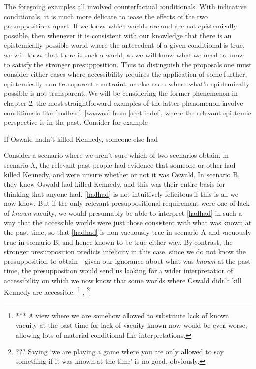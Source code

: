 \documentclass[If.tex]{subfiles}
\begin{document}
\begin{prop}
The foregoing examples all involved counterfactual conditionals. With indicative conditionals, it is much more delicate to tease the effects of the two presuppositions apart. If we know which worlds are and are not epistemically possible, then whenever it is consistent with our knowledge that there is an epistemically possible world where the antecedent of a given conditional is true, we will know that there is such a world, so we will know what we need to know to satisfy the stronger presupposition. Thus to distinguish the proposals one must consider either cases where accessibility requires the application of some further, epistemically non-transparent constraint, or else cases where what's epistemically possible is not transparent. We will be considering the former phenemenon in chapter 2; the most straightforward examples of the latter phenomenon involve conditionals like \ref{hadhad}--\ref{waswas} from \autoref{sect:indcf}, where the relevant epistemic perspective is in the past. Consider for example
\begin{prop}
	\sitem[\ref{hadhad}] If Oswald hadn't killed Kennedy, someone else had 
\end{prop}
Consider a scenario where we aren't sure which of two scenarios obtain. In scenario A, the relevant past people had evidence that someone or other had killed Kennedy, and were unsure whether or not it was Oswald. In scenario B, they knew Oswald had killed Kennedy, and this was their entire basis for thinking that anyone had. \ref{hadhad} is not intuitively felicitous if this is all we now know. But if the only relevant presuppositional requirement were one of lack of \emph{known} vacuity, we would presumably be able to interpret \ref{hadhad} in such a way that the accessible worlds were just those consistent with what was known at the past time, so that \ref{hadhad} is non-vacuously true in scenario A and vacuously true in scenario B, and hence known to be true either way. By contrast, the stronger presupposition predicts infelicity in this case, since we do not know the presupposition to obtain---given our ignorance about what was \emph{known} at the past time, the presupposition would send us looking for a wider interpretation of accessibility on which we now know that some worlds where Oswald didn't kill Kennedy are accessible.%
\footnote{*** A view where we are somehow allowed to substitute lack of known vacuity at the past time for lack of vacuity known now would be even worse, allowing lots of material-conditional-like interpretations.}
,%
\footnote{??? Saying ‘we are playing a game where you are only allowed to say something if it was known at the time’ is no good, obviously.}



\end{prop}
\end{document}
